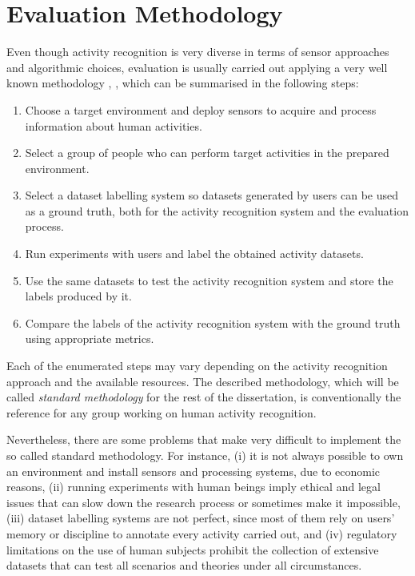 \section{Evaluation Methodology}
\label{sec:evaluation:methodology}

Even though activity recognition is very diverse in terms of sensor approaches and algorithmic choices, evaluation is usually carried out applying a very well known methodology \cite{Riboni2011a}, \cite{Rashidi2011}, \cite{Tapia2004} which can be summarised in the following steps:

\begin{enumerate}
 \item Choose a target environment and deploy sensors to acquire and process information about human activities. 
 \item Select a group of people who can perform target activities in the prepared environment.
 \item Select a dataset labelling system so datasets generated by users can be used as a ground truth, both for the activity recognition system and the evaluation process.
 \item Run experiments with users and label the obtained activity datasets.
 \item Use the same datasets to test the activity recognition system and store the labels produced by it.
 \item Compare the labels of the activity recognition system with the ground truth using appropriate metrics.
\end{enumerate}


Each of the enumerated steps may vary depending on the activity recognition approach and the available resources. The described methodology, which will be called \textit{standard methodology} for the rest of the dissertation, is conventionally the reference for any group working on human activity recognition.

Nevertheless, there are some problems that make very difficult to implement the so called standard methodology. For instance, (i) it is not always possible to own an environment and install sensors and processing systems, due to economic reasons, (ii) running experiments with human beings imply ethical and legal issues that can slow down the research process or sometimes make it impossible, (iii) dataset labelling systems are not perfect, since most of them rely on users' memory or discipline to annotate every activity carried out, and (iv) regulatory limitations on the use of human subjects prohibit the collection of extensive datasets that can test all scenarios and theories under all circumstances. 

